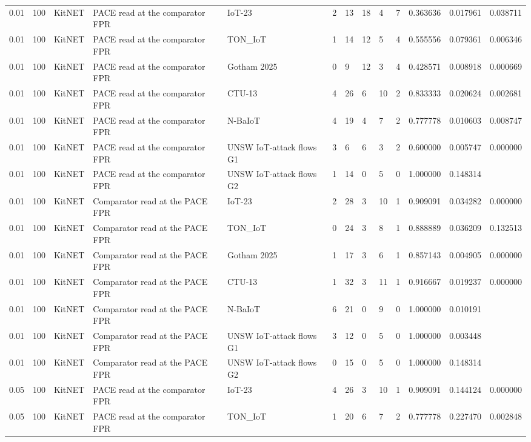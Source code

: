 \begin{tabular}{lllllllllllll}
0.01 & 100 & KitNET & PACE read at the comparator FPR & IoT-23 & 2 & 13 & 18 & 4 & 7 & 0.363636 & 0.017961 & 0.038711 \\
0.01 & 100 & KitNET & PACE read at the comparator FPR & TON\_IoT & 1 & 14 & 12 & 5 & 4 & 0.555556 & 0.079361 & 0.006346 \\
0.01 & 100 & KitNET & PACE read at the comparator FPR & Gotham 2025 & 0 & 9 & 12 & 3 & 4 & 0.428571 & 0.008918 & 0.000669 \\
0.01 & 100 & KitNET & PACE read at the comparator FPR & CTU-13 & 4 & 26 & 6 & 10 & 2 & 0.833333 & 0.020624 & 0.002681 \\
0.01 & 100 & KitNET & PACE read at the comparator FPR & N-BaIoT & 4 & 19 & 4 & 7 & 2 & 0.777778 & 0.010603 & 0.008747 \\
0.01 & 100 & KitNET & PACE read at the comparator FPR & UNSW IoT-attack flows G1 & 3 & 6 & 6 & 3 & 2 & 0.600000 & 0.005747 & 0.000000 \\
0.01 & 100 & KitNET & PACE read at the comparator FPR & UNSW IoT-attack flows G2 & 1 & 14 & 0 & 5 & 0 & 1.000000 & 0.148314 &  \\
0.01 & 100 & KitNET & Comparator read at the PACE FPR & IoT-23 & 2 & 28 & 3 & 10 & 1 & 0.909091 & 0.034282 & 0.000000 \\
0.01 & 100 & KitNET & Comparator read at the PACE FPR & TON\_IoT & 0 & 24 & 3 & 8 & 1 & 0.888889 & 0.036209 & 0.132513 \\
0.01 & 100 & KitNET & Comparator read at the PACE FPR & Gotham 2025 & 1 & 17 & 3 & 6 & 1 & 0.857143 & 0.004905 & 0.000000 \\
0.01 & 100 & KitNET & Comparator read at the PACE FPR & CTU-13 & 1 & 32 & 3 & 11 & 1 & 0.916667 & 0.019237 & 0.000000 \\
0.01 & 100 & KitNET & Comparator read at the PACE FPR & N-BaIoT & 6 & 21 & 0 & 9 & 0 & 1.000000 & 0.010191 &  \\
0.01 & 100 & KitNET & Comparator read at the PACE FPR & UNSW IoT-attack flows G1 & 3 & 12 & 0 & 5 & 0 & 1.000000 & 0.003448 &  \\
0.01 & 100 & KitNET & Comparator read at the PACE FPR & UNSW IoT-attack flows G2 & 0 & 15 & 0 & 5 & 0 & 1.000000 & 0.148314 &  \\
0.05 & 100 & KitNET & PACE read at the comparator FPR & IoT-23 & 4 & 26 & 3 & 10 & 1 & 0.909091 & 0.144124 & 0.000000 \\
0.05 & 100 & KitNET & PACE read at the comparator FPR & TON\_IoT & 1 & 20 & 6 & 7 & 2 & 0.777778 & 0.227470 & 0.002848 \\

\end{tabular}
